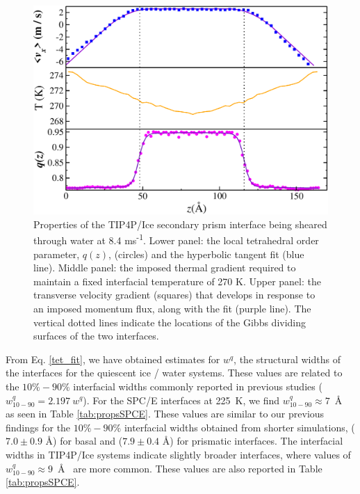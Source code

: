 \begin{figure}
\includegraphics[width=\linewidth]{Figures/SecPrism_TIP4PIce_Plot}
\caption{\label{fig:tipsComic} Properties of the TIP4P/Ice secondary prism
  interface being sheared through water at 8.4
  ms\textsuperscript{-1}. Lower panel: the local tetrahedral order
  parameter, $q(z)$, (circles) and the hyperbolic tangent fit
  (blue line).  Middle panel: the imposed thermal gradient
  required to maintain a fixed interfacial temperature of 270 K. Upper
  panel: the transverse velocity gradient (squares) that develops in
  response to an imposed momentum flux, along with the fit (purple
  line). The vertical dotted lines indicate the locations of the Gibbs
  dividing surfaces of the two interfaces.}
\end{figure}

From Eq. \eqref{tet_fit}, we have obtained estimates for $w^{q}$, the
structural widths of the interfaces for the quiescent ice / water
systems. These values are related to the $10\%-90\%$ interfacial
widths commonly reported in previous studies
($w_\mathrm{10-90}^{q} = 2.197~w^{q}$).\cite{Bryk2002,Bryk2004} For the
SPC/E interfaces at 225~K, we find
$w_\mathrm{10-90}^{q} \approx 7$~\AA~ as seen in Table
\ref{tab:propsSPCE}. These values are similar to our previous findings
for the $10\%-90\%$ interfacial widths obtained from shorter
simulations, ($7.0 \pm 0.9$ \AA) for basal and ($7.9 \pm 0.4$ \AA) for
prismatic interfaces.\cite{Louden2013a} The interfacial widths in
TIP4P/Ice systems indicate slightly broader interfaces, where values
of $w_\mathrm{10-90}^{q} \approx 9$~\AA~ are more common. These values
are also reported in Table \ref{tab:propsSPCE}.

